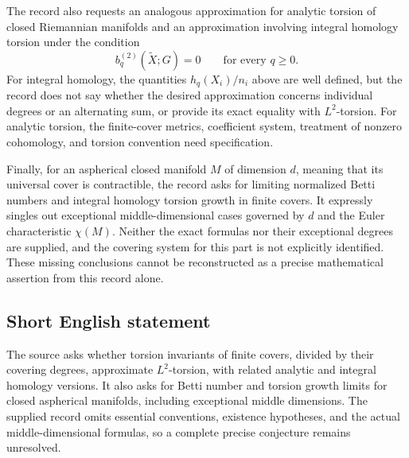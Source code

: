 \documentclass[11pt]{article}
\begin{document}
The record also requests an analogous approximation for analytic torsion of closed Riemannian manifolds and an approximation involving integral homology torsion under the condition
\[
b_q^{(2)}(\widetilde X;G)=0\qquad\text{for every }q\geq0.
\]
For integral homology, the quantities \(h_q(X_i)/n_i\) above are well defined, but the record does not say whether the desired approximation concerns individual degrees or an alternating sum, or provide its exact equality with \(L^2\)-torsion. For analytic torsion, the finite-cover metrics, coefficient system, treatment of nonzero cohomology, and torsion convention need specification.

Finally, for an aspherical closed manifold \(M\) of dimension \(d\), meaning that its universal cover is contractible, the record asks for limiting normalized Betti numbers and integral homology torsion growth in finite covers. It expressly singles out exceptional middle-dimensional cases governed by \(d\) and the Euler characteristic \(\chi(M)\). Neither the exact formulas nor their exceptional degrees are supplied, and the covering system for this part is not explicitly identified. These missing conclusions cannot be reconstructed as a precise mathematical assertion from this record alone.
\subsection{Short English statement}
The source asks whether torsion invariants of finite covers, divided by their covering degrees, approximate \(L^2\)-torsion, with related analytic and integral homology versions. It also asks for Betti number and torsion growth limits for closed aspherical manifolds, including exceptional middle dimensions. The supplied record omits essential conventions, existence hypotheses, and the actual middle-dimensional formulas, so a complete precise conjecture remains unresolved.
\end{document}

